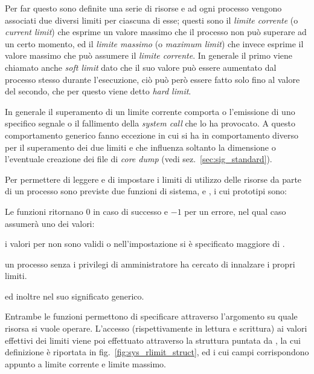 Per far questo sono definite una serie di risorse e ad ogni processo vengono
associati due diversi limiti per ciascuna di esse; questi sono il
\textsl{limite corrente} (o \textit{current limit}) che esprime un valore
massimo che il processo non può superare ad un certo momento, ed il
\textsl{limite massimo} (o \textit{maximum limit}) che invece esprime il
valore massimo che può assumere il \textsl{limite corrente}. In generale il
primo viene chiamato anche \textit{soft limit} dato che il suo valore può
essere aumentato dal processo stesso durante l'esecuzione, ciò può però essere
fatto solo fino al valore del secondo, che per questo viene detto \textit{hard
  limit}.

In generale il superamento di un limite corrente comporta o l'emissione di uno
specifico segnale o il fallimento della \textit{system call} che lo ha
provocato. A questo comportamento generico fanno eccezione 
in cui si ha in comportamento diverso per il superamento dei due limiti e
 che influenza soltanto la dimensione o l'eventuale
creazione dei file di \textit{core dump} (vedi sez.~\ref{sec:sig_standard}).

Per permettere di leggere e di impostare i limiti di utilizzo delle risorse da
parte di un processo sono previste due funzioni di sistema, 
e , i cui prototipi sono:

\begin{funcproto}{
}

{Le funzioni ritornano $0$ in caso di successo e $-1$ per un errore, nel qual
  caso  assumerà uno dei valori:
  \begin{errlist}
  \item[\errcode{EINVAL}] i valori per  non sono validi o
    nell'impostazione si è specificato  maggiore di
    .
    \item[\errcode{EPERM}] un processo senza i privilegi di amministratore ha
    cercato di innalzare i propri limiti.
  \end{errlist}
  ed inoltre  nel suo significato generico.  
}  
\end{funcproto}

Entrambe le funzioni permettono di specificare attraverso l'argomento
 su quale risorsa si vuole operare. L'accesso (rispettivamente
in lettura e scrittura) ai valori effettivi dei limiti viene poi effettuato
attraverso la struttura  puntata da
, la cui definizione è riportata in
fig.~\ref{fig:sys_rlimit_struct}, ed i cui campi corrispondono appunto a
limite corrente e limite massimo.

